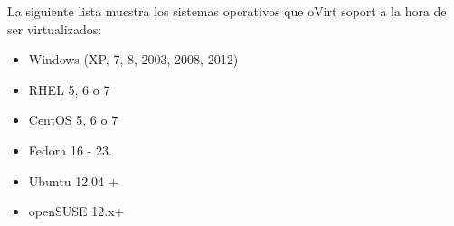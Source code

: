 La siguiente lista muestra los sistemas operativos que oVirt soport a la hora de ser virtualizados:

\begin{itemize}
    \item Windows (XP, 7, 8, 2003, 2008, 2012)
    \item RHEL 5, 6 o 7
    \item CentOS 5, 6 o 7
    \item Fedora 16 - 23.
    \item Ubuntu 12.04 + 
    \item openSUSE 12.x+
\end{itemize}

